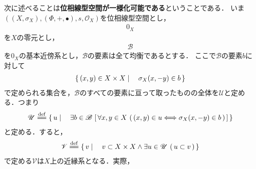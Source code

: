 	次に述べることは{\bf 位相線型空間が一様化可能である}ということである．
	いま$\left(\left(X,\sigma_X\right),(\Phi,+,\bullet),s,\mathscr{O}_X\right)$を位相線型空間とし，
	\begin{align}
		0_X
	\end{align}
	を$X$の零元とし，
	\begin{align}
		\mathscr{B}
	\end{align}
	を$0_X$の基本近傍系とし，$\mathscr{B}$の要素は全て均衡であるとする．
	ここで$\mathscr{B}$の要素$b$に対して
	\begin{align}
		\left\{\, (x,y) \in X \times X \mid \quad \sigma_X(x,-y) \in b\, \right\}
	\end{align}
	で定められる集合を，$\mathscr{B}$のすべての要素に亘って取ったものの全体を$\mathscr{U}$と定める．つまり
	\begin{align}
		\mathscr{U} \defeq \Set{u}{\exists b \in \mathscr{B}\,
		\left[\, \forall x,y \in X\, \left(\, (x,y) \in u \Longleftrightarrow\sigma_X(x,-y) \in b\, \right)\, \right]}
	\end{align}
	と定める．すると，
	\begin{align}
		\mathscr{V} \defeq \Set{v}{v \subset X \times X \wedge \exists u \in \mathscr{U}\,
		\left(\, u \subset v\, \right)}
	\end{align}
	で定める$\mathscr{V}$は$X$上の近縁系となる．実際，
